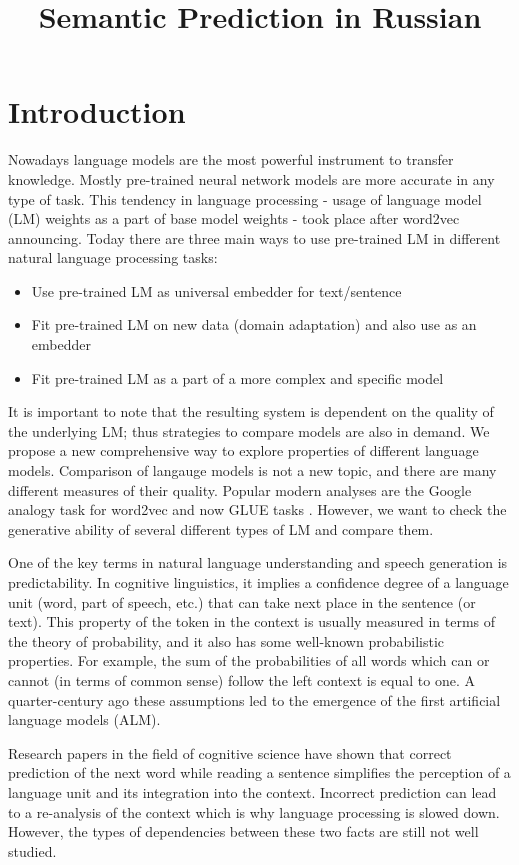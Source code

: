 \documentclass[a4paper]{article}
\title{Semantic Prediction in {R}ussian}
\begin{document}
\maketitleabstract
\nocite{*}


\section{Introduction}

Nowadays language models are the most powerful instrument to transfer knowledge. Mostly pre-trained neural network models are more accurate in any type of task. This tendency in language processing - usage of language model (LM) weights as a part of base model weights - took place after word2vec announcing. Today there are three main ways to use pre-trained LM in different natural language processing tasks:
\begin{itemize}
	\item Use pre-trained LM as universal embedder for text/sentence
	\item Fit pre-trained LM on new data (domain adaptation) and also use as an embedder
	\item Fit pre-trained LM as a part of a more complex and specific model
\end{itemize}
It is important to note that the resulting system is dependent on the
quality of the underlying LM; thus strategies to compare models are
also in demand. We propose a new comprehensive way to explore properties of different language models.
Comparison of langauge models is not a new topic, and there are many
different measures of their quality. Popular modern analyses are the
Google analogy task for word2vec \cite{mikolov2013efficient} and now
GLUE tasks \cite{Wang2018GLUEAM}. However, we want to check the
generative ability of several different types of LM and compare them.

One of the key terms in natural language understanding and speech generation is predictability. In cognitive linguistics, it implies a confidence degree of a language unit (word, part of speech, etc.) that can take next place in the sentence (or text). This property of the token in the context is usually measured in terms of the theory of probability, and it also has some well-known probabilistic properties. For example, the sum of the probabilities of all words which can or cannot (in terms of common sense) follow the left context is equal to one. A quarter-century ago these assumptions led to the emergence of the first artificial language models (ALM).

Research papers in the field of cognitive science have shown that correct prediction of the next word while reading a sentence simplifies the perception of a language unit and its integration into the context. Incorrect prediction can lead to a re-analysis of the context which is why language processing is slowed down. However, the types of dependencies between these two facts are still not well studied.
\end{document}

